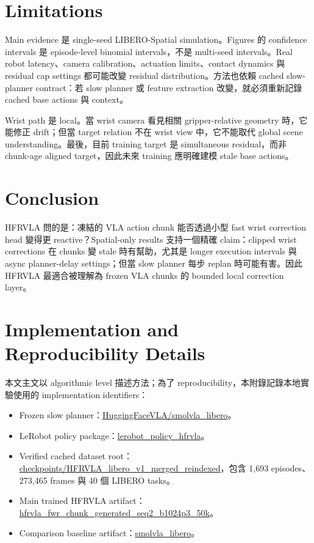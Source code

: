 \documentclass[10pt]{article}
\newcommand{\method}{HFRVLA}
\begin{document}
\section{Limitations}

Main evidence 是 single-seed LIBERO-Spatial simulation。Figures 的 confidence intervals 是 episode-level binomial intervals，不是 multi-seed intervals。Real robot latency、camera calibration、actuation limits、contact dynamics 與 residual cap settings 都可能改變 residual distribution。方法也依賴 cached slow-planner contract：若 slow planner 或 feature extraction 改變，就必須重新記錄 cached base actions 與 context。

Wrist path 是 local。當 wrist camera 看見相關 gripper-relative geometry 時，它能修正 drift；但當 target relation 不在 wrist view 中，它不能取代 global scene understanding。最後，目前 training target 是 simultaneous residual，而非 chunk-age aligned target，因此未來 training 應明確建模 stale base actions。

\section{Conclusion}

\method{} 問的是：凍結的 VLA action chunk 能否透過小型 fast wrist correction head 變得更 reactive？Spatial-only results 支持一個精確 claim：clipped wrist corrections 在 chunks 變 stale 時有幫助，尤其是 longer execution intervals 與 async planner-delay settings；但當 slow planner 每步 replan 時可能有害。因此 \method{} 最適合被理解為 frozen VLA chunks 的 bounded local correction layer。

\appendix

\section{Implementation and Reproducibility Details}
\label{app:implementation-reproducibility-zh}

本文主文以 algorithmic level 描述方法；為了 reproducibility，本附錄記錄本地實驗使用的 implementation identifiers：
\begin{itemize}
  \item Frozen slow planner：\url{HuggingFaceVLA/smolvla_libero}。
  \item LeRobot policy package：\url{lerobot_policy_hfrvla}。
  \item Verified cached dataset root：\url{checkpoints/HFRVLA_libero_v1_merged_reindexed}，包含 1,693 episodes、273,465 frames 與 40 個 LIBERO tasks。
  \item Main trained HFRVLA artifact：\url{hfrvla_fwr_chunk_generated_seq2_b1024p3_50k}。
  \item Comparison baseline artifact：\url{smolvla_libero}。
\end{itemize}
\end{document}
